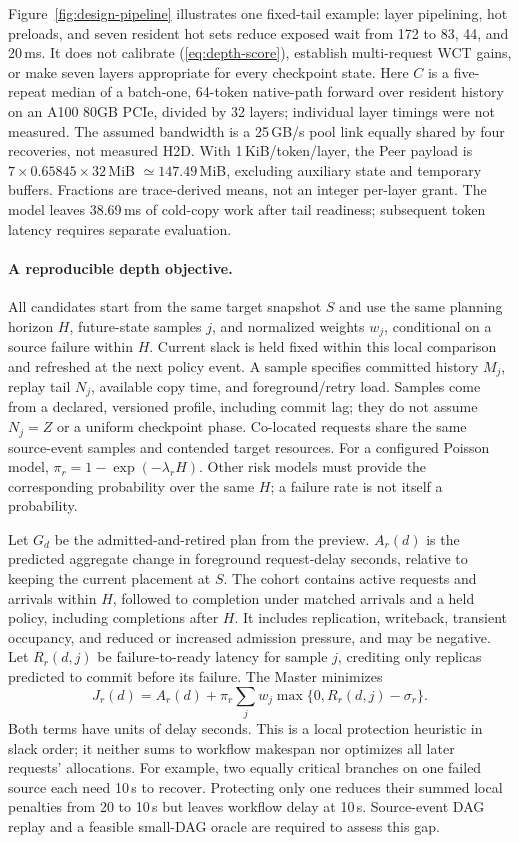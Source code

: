 Figure~\ref{fig:design-pipeline} illustrates one fixed-tail example:
layer pipelining, hot preloads, and seven resident hot sets reduce exposed
wait from 172 to 83, 44, and 20\,ms. It does not calibrate
(\ref{eq:depth-score}), establish multi-request WCT gains, or make seven
layers appropriate for every checkpoint state.
Here $C$ is a five-repeat median of a batch-one, 64-token native-path
forward over resident history on an A100 80GB PCIe, divided by 32 layers;
individual layer timings were not measured. The assumed bandwidth is a
25\,GB/s pool link equally shared by four recoveries, not measured H2D.
With 1\,KiB/token/layer, the Peer payload is
$7\times0.65845\times32$\,MiB $\simeq147.49$\,MiB, excluding auxiliary
state and temporary buffers. Fractions are trace-derived means, not an
integer per-layer grant. The model leaves 38.69\,ms of cold-copy work
after tail readiness; subsequent token latency requires separate evaluation.

\paragraph{A reproducible depth objective.}
All candidates start from the same target snapshot $S$ and use the same
planning horizon $H$, future-state samples $j$, and normalized weights $w_j$,
conditional on a source failure within $H$. Current slack is held fixed
within this local comparison and refreshed at the next policy event.
A sample specifies committed history $M_j$, replay tail $N_j$, available
copy time, and foreground/retry load. Samples come from a declared,
versioned profile, including commit lag; they do not assume $N_j=Z$ or
a uniform checkpoint phase. Co-located requests share the same source-event
samples and contended target resources. For a configured Poisson model,
$\pi_r=1-\exp(-\lambda_r H)$. Other risk models must provide the corresponding
probability over the same $H$; a failure rate is not itself a probability.

Let $G_d$ be the admitted-and-retired plan from the preview.
$A_r(d)$ is the predicted aggregate change in foreground request-delay
seconds, relative to keeping the current placement at $S$. The cohort
contains active requests and arrivals within $H$, followed to completion
under matched arrivals and a held policy, including completions after $H$.
It includes replication, writeback, transient occupancy, and reduced or
increased admission pressure, and may be negative. Let $R_r(d,j)$ be
failure-to-ready latency for sample $j$, crediting only replicas predicted
to commit before its failure. The Master minimizes
\begin{equation}
 J_r(d)=A_r(d)+\pi_r\sum_j w_j
          \max\{0,R_r(d,j)-\sigma_r\}.
 \label{eq:depth-score}
\end{equation}
Both terms have units of delay seconds. This is a local protection
heuristic in slack order; it neither sums to workflow makespan nor
optimizes all later requests' allocations.
For example, two equally critical branches on one failed source each
need 10\,s to recover. Protecting only one reduces their summed local
penalties from 20 to 10\,s but leaves workflow delay at 10\,s. Source-event
DAG replay and a feasible small-DAG oracle are required to assess this gap.

